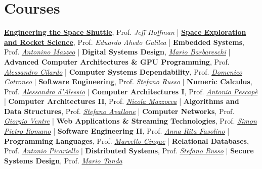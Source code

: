 \documentclass[letterpaper]{twentysecondcv} %
\begin{document}

\section{Courses}

\href{https://www.edx.org/course/engineering-the-space-shuttle}{\textbf{Engineering the Space Shuttle}}, Prof. \textit{Jeff Hoffman} |
\href{https://www.edx.org/course/the-conquest-of-space-space-exploration-and-rocket}{\textbf{Space Exploration and Rocket Science}}, Prof. \textit{Eduardo Ahedo Galilea} |
\textbf{Embedded Systems}, Prof. \href{https://www.docenti.unina.it/antonino.mazzeo}{\textit{Antonino Mazzeo}} |
\textbf{Digital Systems Design}, \href{https://www.researchgate.net/profile/Mario_Barbareschi}{\textit{Mario Barbareschi}} |
\textbf{Advanced Computer Architectures \& GPU Programming}, Prof. \href{https://www.docenti.unina.it/alessandro.cilardo}{\textit{Alessandro Cilardo}} |
\textbf{Computer Systems Dependability}, Prof. \href{https://www.docenti.unina.it/domenico.cotroneo}{\textit{Domenico Cotroneo}} |
\textbf{Software Engineering}, Prof. \href{https://www.docenti.unina.it/stefano.russo}{\textit{Stefano Russo}} |
\textbf{Numeric Calculus}, Prof. \href{https://www.docenti.unina.it/alessandra.dalessio}{\textit{Alessandra d'Alessio}} |
\textbf{Computer Architectures I}, Prof. \href{https://www.docenti.unina.it/antonio.pescape}{\textit{Antonio Pescapè}} |
\textbf{Computer Architectures II}, Prof. \href{https://www.docenti.unina.it/nicola.mazzocca}{\textit{Nicola Mazzocca}} |
\textbf{Algorithms and Data Structures}, Prof. \href{https://www.docenti.unina.it/stefano.avallone}{\textit{Stefano Avallone}} |
\textbf{Computer Networks}, Prof. \href{https://www.docenti.unina.it/giorgio.ventre}{\textit{Giorgio Ventre}} |
\textbf{Web Applications \& Streaming Technologies}, Prof. \href{https://www.docenti.unina.it/simonpietro.romano}{\textit{Simon Pietro Romano}} |
\textbf{Software Engineering II}, Prof. \href{https://www.docenti.unina.it/annarita.fasolino}{\textit{Anna Rita Fasolino}} |
\textbf{Programming Languages}, Prof. \href{https://www.docenti.unina.it/marcello.cinque}{\textit{Marcello Cinque}} |
\textbf{Relational Databases}, Prof. \href{https://www.docenti.unina.it/antonio.picariello}{\textit{Antonio Picariello}} |
\textbf{Distributed Systems}, Prof. \href{https://www.docenti.unina.it/stefano.russo}{\textit{Stefano Russo}} |
\textbf{Secure Systems Design}, Prof. \href{ttps://www.docenti.unina.it/mario.tanda}{\textit{Mario Tanda}}
\end{document}

